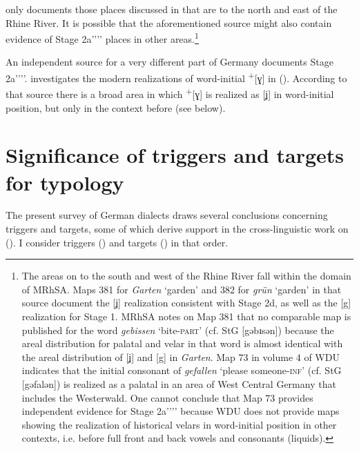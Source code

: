  only documents those places discussed in \citet{CornelissenEtAl1989} that are to the north and east of the Rhine River. It is possible that the aforementioned source might also contain evidence of Stage 2a'{}'{}'{}' places in other areas.\footnote{{The areas on  to the south and west of the Rhine River fall within the domain of MRhSA. Maps 381 for} \textrm{\textit{Garten}} \textrm{‘garden’ and 382 for} \textrm{\textit{grün}} \textrm{‘garden’ in that source document the [ʝ] realization consistent with Stage 2d, as well as the [g] realization for Stage 1. MRhSA notes on Map 381 that no comparable map is published for the word} \textrm{\textit{gebissen}} \textrm{‘bite-}\textrm{\textsc{part}}\textrm{’ (cf. StG [gəbɪsən]) because the areal distribution for palatal and velar in that word is almost identical with the areal distribution of [ʝ] and [g] in} \textrm{\textit{Garten}}. \textrm{Map 73 in volume 4 of WDU indicates that the initial consonant of} \textrm{\textit{gefallen}} \textrm{‘please someone-}\textrm{\textsc{inf}}\textrm{’ (cf. StG [gəfalən]) is realized as a palatal in an area of West Central Germany that includes the Westerwald. One cannot conclude that Map 73 provides independent evidence for Stage 2a'{}'{}'{}' because WDU does not provide maps showing the realization of historical velars in word-initial position in other contexts, i.e. before full front and back vowels and consonants (liquids).}}

An independent source for a very different part of Germany \citep{Kieser1963} documents Stage 2a'{}'{}'{}'. \citet{Kieser1963} investigates the modern realizations of word-initial  \textsuperscript{+}[ɣ] in  (). According to that source there is a broad area in which  \textsuperscript{+}[ɣ] is realized as [ʝ] in word-initial position, but only in the context before  (see  below).

\section{{Significance} {of} {triggers} {and} {targets} {for} {typology}}\label{sec:12.7}

The present survey of German dialects draws several conclusions concerning triggers and targets, some of which derive support in the cross-linguistic work on  (). I consider triggers () and targets () in that order.


